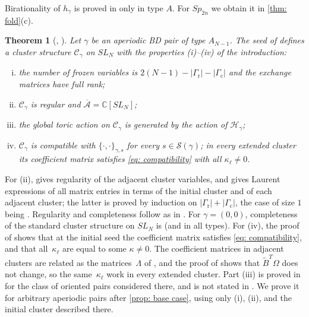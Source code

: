 \documentclass[a4paper]{amsart}
\numberwithin{equation}{section}
\newtheorem{theorem}{Theorem}[section]
\theoremstyle{definition}
\theoremstyle{remark}
\newcommand{\bbC}{\mathbb{C}}
\newcommand{\mcH}{\mathcal{H}}
\newcommand{\mcC}{\mathcal{C}}
\newcommand{\mcS}{\mathcal{S}}
\newcommand{\oA}{\overline{\mathcal{A}}}
\newcommand{\tB}{\widetilde{B}}
\newcommand{\rr}{\mathrm{r}}
\newcommand{\cc}{\mathrm{c}}
\newcommand{\Sp}{Sp_{2n}}
\begin{document}
Birationality of $h_\gamma$ is proved in \cite{GSV23} only in type $A$.
For $\Sp$ we obtain it in \cref{thm: fold}(c).

\begin{theorem}[{\cite[Theorem~3.3]{GSV19}, \cite[Theorems~4.3, 4.11, 4.14, 4.17]{GSV23}}]
  \label{thm: GSV}
  Let $\gamma$ be an aperiodic BD pair of type $A_{N-1}$.
  The seed of \cite[Theorem~4.11]{GSV23} defines a cluster structure $\mcC_\gamma$ on $SL_N$ with the properties (i)--(iv) of the introduction:
  \begin{enumerate}[(i)]
    \item the number of frozen variables is $2(N-1)-|\Gamma_{\rr}|-|\Gamma_{\cc}|$ and the exchange matrices have full rank;
    \item $\mcC_\gamma$ is regular and $\oA=\bbC[SL_N]$;
    \item the global toric action on $\mcC_\gamma$ is generated by the action of $\mcH_\gamma$;
    \item $\mcC_\gamma$ is compatible with $\{\cdot,\cdot\}_{\gamma,s}$ for every $s\in\mcS(\gamma)$; in every extended cluster its coefficient matrix satisfies \eqref{eq: compatibility} with all $\kappa_\ell\neq0$.
  \end{enumerate}
\end{theorem}

For (ii), \cite[Theorem~4.14]{GSV23} gives regularity of the adjacent cluster variables, and \cite[Theorem~4.17]{GSV23} gives Laurent expressions of all matrix entries in terms of the initial cluster and of each adjacent cluster; the latter is proved by induction on $|\Gamma_{\rr}|+|\Gamma_{\cc}|$, the case of size $1$ being \cite[Section~7.3]{GSV19}.
Regularity and completeness follow as in \cite[Sections~4.4--4.5]{GSV23}.
For $\gamma=(0,0)$, completeness of the standard cluster structure on $SL_N$ is \cite{Oya25} (and \cite[Theorem~B.1]{QY25} in all types).
For (iv), the proof of \cite[Theorem~4.11]{GSV23} shows that at the initial seed the coefficient matrix satisfies \eqref{eq: compatibility}, and that all~$\kappa_\ell$ are equal to some $\kappa\neq0$.
The coefficient matrices in adjacent clusters are related as the matrices~$\Lambda$ of \cite[(3.4)]{BZ05}, and the proof of \cite[Proposition~3.4]{BZ05} shows that $\tB^T\Omega$ does not change, so the same~$\kappa_\ell$ work in every extended cluster.
Part (iii) is proved in \cite[Theorem~3.3]{GSV19} for the class of oriented pairs considered there, and is not stated in \cite{GSV23}.
We prove it for arbitrary aperiodic pairs after \cref{prop: base case}, using only (i), (ii), and the initial cluster described there.
\end{document}
